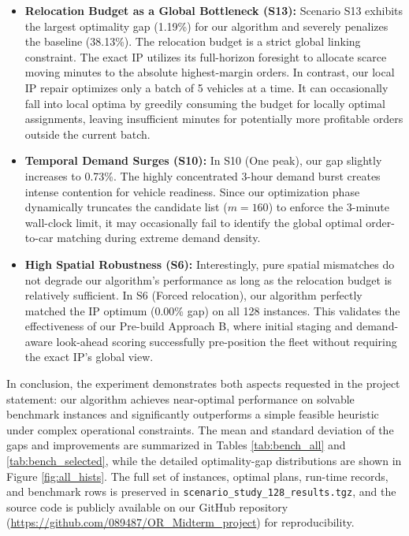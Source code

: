 \documentclass[10pt,a4paper]{article}
\begin{document}
\begin{itemize}[itemsep=2pt, parsep=0pt, topsep=4pt]
    \item \textbf{Relocation Budget as a Global Bottleneck (S13):} Scenario S13 exhibits the largest optimality gap (1.19\%) for our algorithm and severely penalizes the baseline (38.13\%). The relocation budget is a strict global linking constraint. The exact IP utilizes its full-horizon foresight to allocate scarce moving minutes to the absolute highest-margin orders. In contrast, our local IP repair optimizes only a batch of 5 vehicles at a time. It can occasionally fall into local optima by greedily consuming the budget for locally optimal assignments, leaving insufficient minutes for potentially more profitable orders outside the current batch.
    
    \item \textbf{Temporal Demand Surges (S10):} In S10 (One peak), our gap slightly increases to 0.73\%. The highly concentrated 3-hour demand burst creates intense contention for vehicle readiness. Since our optimization phase dynamically truncates the candidate list ($m=160$) to enforce the 3-minute wall-clock limit, it may occasionally fail to identify the global optimal order-to-car matching during extreme demand density.

    \item \textbf{High Spatial Robustness (S6):} Interestingly, pure spatial mismatches do not degrade our algorithm's performance as long as the relocation budget is relatively sufficient. In S6 (Forced relocation), our algorithm perfectly matched the IP optimum (0.00\% gap) on all 128 instances. This validates the effectiveness of our Pre-build Approach B, where initial staging and demand-aware look-ahead scoring successfully pre-position the fleet without requiring the exact IP's global view.
\end{itemize}

In conclusion, the experiment demonstrates both aspects requested in the project statement: our algorithm achieves near-optimal performance on solvable benchmark instances and significantly outperforms a simple feasible heuristic under complex operational constraints. The mean and standard deviation of the gaps and improvements are summarized in Tables \ref{tab:bench_all} and \ref{tab:bench_selected}, while the detailed optimality-gap distributions are shown in Figure \ref{fig:all_hists}. The full set of instances, optimal plans, run-time records, and benchmark rows is preserved in \texttt{scenario\_study\_128\_results.tgz}, and the source code is publicly available on our GitHub repository (\url{https://github.com/089487/OR_Midterm_project}) for reproducibility.
\end{document}
